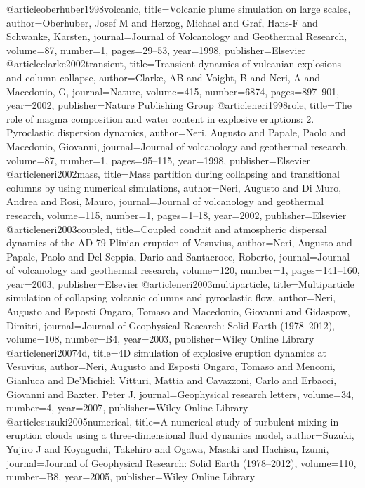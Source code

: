 @article{oberhuber1998volcanic,
  title={Volcanic plume simulation on large scales},
  author={Oberhuber, Josef M and Herzog, Michael and Graf, Hans-F and Schwanke, Karsten},
  journal={Journal of Volcanology and Geothermal Research},
  volume={87},
  number={1},
  pages={29--53},
  year={1998},
  publisher={Elsevier}
}
@article{clarke2002transient,
  title={Transient dynamics of vulcanian explosions and column collapse},
  author={Clarke, AB and Voight, B and Neri, A and Macedonio, G},
  journal={Nature},
  volume={415},
  number={6874},
  pages={897--901},
  year={2002},
  publisher={Nature Publishing Group}
}
@article{neri1998role,
  title={The role of magma composition and water content in explosive eruptions: 2. Pyroclastic dispersion dynamics},
  author={Neri, Augusto and Papale, Paolo and Macedonio, Giovanni},
  journal={Journal of volcanology and geothermal research},
  volume={87},
  number={1},
  pages={95--115},
  year={1998},
  publisher={Elsevier}
}
@article{neri2002mass,
  title={Mass partition during collapsing and transitional columns by using numerical simulations},
  author={Neri, Augusto and Di Muro, Andrea and Rosi, Mauro},
  journal={Journal of volcanology and geothermal research},
  volume={115},
  number={1},
  pages={1--18},
  year={2002},
  publisher={Elsevier}
}
@article{neri2003coupled,
  title={Coupled conduit and atmospheric dispersal dynamics of the AD 79 Plinian eruption of Vesuvius},
  author={Neri, Augusto and Papale, Paolo and Del Seppia, Dario and Santacroce, Roberto},
  journal={Journal of volcanology and geothermal research},
  volume={120},
  number={1},
  pages={141--160},
  year={2003},
  publisher={Elsevier}
}
@article{neri2003multiparticle,
  title={Multiparticle simulation of collapsing volcanic columns and pyroclastic flow},
  author={Neri, Augusto and Esposti Ongaro, Tomaso and Macedonio, Giovanni and Gidaspow, Dimitri},
  journal={Journal of Geophysical Research: Solid Earth (1978--2012)},
  volume={108},
  number={B4},
  year={2003},
  publisher={Wiley Online Library}
}
@article{neri20074d,
  title={4D simulation of explosive eruption dynamics at Vesuvius},
  author={Neri, Augusto and Esposti Ongaro, Tomaso and Menconi, Gianluca and De'Michieli Vitturi, Mattia and Cavazzoni, Carlo and Erbacci, Giovanni and Baxter, Peter J},
  journal={Geophysical research letters},
  volume={34},
  number={4},
  year={2007},
  publisher={Wiley Online Library}
}
@article{suzuki2005numerical,
  title={A numerical study of turbulent mixing in eruption clouds using a three-dimensional fluid dynamics model},
  author={Suzuki, Yujiro J and Koyaguchi, Takehiro and Ogawa, Masaki and Hachisu, Izumi},
  journal={Journal of Geophysical Research: Solid Earth (1978--2012)},
  volume={110},
  number={B8},
  year={2005},
  publisher={Wiley Online Library}
}

